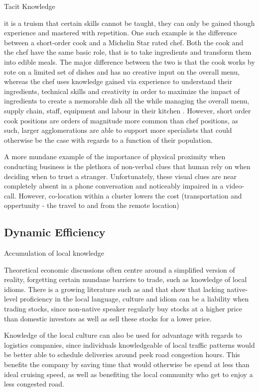 \documentclass[12pt,letterpaper,notitlepage,onecolumn,final,openbib]{article}
\begin{document}
	Tacit Knowledge 
	
	it is a truism that certain skills cannot be taught, they can only be gained though experience and mastered with repetition.  One such example is the difference between a short-order cook and a Michelin Star rated chef.  Both the cook and the chef have the same basic role, that is to take ingredients and transform them into edible meals.  The major difference between the two is that the cook works by rote on a limited set of dishes and has no creative input on the overall menu, whereas the chef uses knowledge gained via experience to understand their ingredients, technical skills and creativity in order to maximize the impact of ingredients to create a memorable dish all the while managing the overall menu, supply chain, staff, equipment and labour in their kitchen \cite{Klein2010}.  However, short order cook positions are orders of magnitude more common than chef positions, as such, larger agglomerations are able to support more specialists that could otherwise be the case with regards to a function of their population.  
	
	A more mundane example of the importance of physical proximity when conducting business is the plethora of non-verbal clues that human rely on when deciding when to trust a stranger.  Unfortunately, these visual clues are near completely absent in a phone conversation and noticeably impaired in a video-call.  However, co-location within a cluster lowers the cost (transportation and oppertunity - the travel to and from the remote location) 
	
	\subsection{Dynamic Efficiency}
	
	Accumulation of local knowledge
	
	Theoretical economic discussions often centre around a simplified version of reality, forgetting certain mundane barriers to trade, such as knowledge of local idioms.  There is a growing literature such as  \cite{Hau2001} and \cite{choedo2004} that show that lacking native-level proficiency in the local language, culture and idiom can be a liability when trading stocks, since non-native speaker regularly buy stocks at a higher price than domestic investors as well as sell these stocks for a lower price.
	
	Knowledge of the local culture can also be used for advantage with regards to logistics companies, since individuals knowledgeable of local traffic patterns would be better able to schedule deliveries around peek road congestion hours.  This benefits the company by saving time that would otherwise be spend at less than ideal cruising speed, as well as benefiting the local community who get to enjoy a less congested road. 
	
\end{document}
